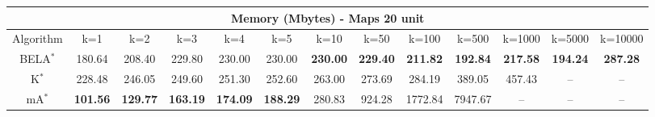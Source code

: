\begin{tabular}{c|cccccccccccc}\toprule
\multicolumn{13}{c}{Memory (Mbytes) - Maps 20 unit}\\ \midrule
Algorithm & k=1 & k=2 & k=3 & k=4 & k=5 & k=10 & k=50 & k=100 & k=500 & k=1000 & k=5000 & k=10000 \\ \midrule
BELA$^*$ & 180.64 & 208.40 & 229.80 & 230.00 & 230.00 & \textbf{230.00} & \textbf{229.40} & \textbf{211.82} & \textbf{192.84} & \textbf{217.58} & \textbf{194.24} & \textbf{287.28} \\
K$^*$ & 228.48 & 246.05 & 249.60 & 251.30 & 252.60 & 263.00 & 273.69 & 284.19 & 389.05 & 457.43 & -- & -- \\
mA$^*$ & \textbf{101.56} & \textbf{129.77} & \textbf{163.19} & \textbf{174.09} & \textbf{188.29} & 280.83 & 924.28 & 1772.84 & 7947.67 & -- & -- & -- \\ \bottomrule 
\end{tabular}
